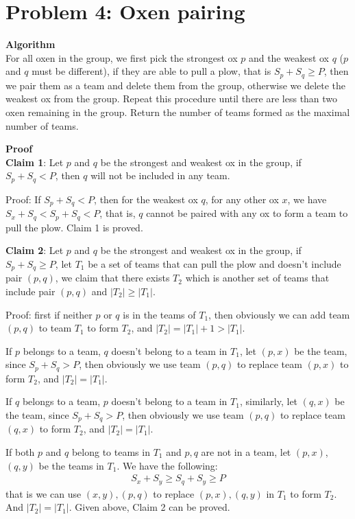 \documentclass{article}
\newcommand{\Proof}{\vspace{0.3cm} \noindent\textbf{Proof} \\}
\newcommand{\Algorithm}{\textbf{Algorithm} \\}
\begin{document}
\section*{Problem 4: Oxen pairing}
\Algorithm
For all oxen in the group, we first pick the strongest ox $p$ and the weakest ox $q$ ($p$ and $q$
must be different), if they 
are able to pull a plow, that is $S_p + S_q \geq P$, then we pair them as a team and delete them
from the group, otherwise we delete the weakest ox from the group. Repeat this procedure until there 
are less than two oxen remaining in the group. Return the number of teams formed as the maximal
number of teams.

\Proof
\textbf{Claim 1}: 
Let $p$ and $q$ be the strongest and weakest ox in the group, if $S_p + S_q < P$,
then $q$ will not be included in any team.

Proof: If $S_p + S_q < P$, then for the weakest ox $q$, for any other ox $x$, we have $S_x + S_q <
S_p + S_q < P$, that is, $q$ cannot be paired with any ox to form a team to pull the plow. Claim 1
is proved.

\vspace{0.3cm}
\textbf{Claim 2}: 
Let $p$ and $q$ be the strongest and weakest ox in the group, if $S_p + S_q \geq P$, let $T_1$ be a
set of teams that can pull the plow and doesn't include pair $(p, q)$, we claim that there exists
$T_2$ which is another set of teams that include pair $(p, q)$ and $|T_2| \geq |T_1|$.

Proof: first if neither $p$ or $q$ is in the teams of $T_1$, then obviously we can add team $(p,
q)$ to team $T_1$ to form $T_2$, and $|T_2| = |T_1| + 1 > |T_1|$.

If $p$ belongs to a team, $q$ doesn't belong to a team in $T_1$, let $(p, x)$ be the team, since 
$S_p + S_q > P$, then obviously we use team $(p, q)$ to replace team $(p, x)$ to form $T_2$, and 
$|T_2| = |T_1|$.


If $q$ belongs to a team, $p$ doesn't belong to a team in $T_1$, similarly, let $(q, x)$ be the team, since 
$S_p + S_q > P$, then obviously we use team $(p, q)$ to replace team $(q, x)$ to form $T_2$, and 
$|T_2| = |T_1|$.

If both $p$ and $q$ belong to teams in $T_1$ and $p, q$ are not in a team, let $(p, x)$, $(q, y)$ be
the teams in $T_1$. We have the following:
\begin{align}
  S_x + S_y \geq S_q + S_y \geq P 
\end{align}
that is we can use $(x, y), (p, q)$ to replace $(p, x), (q, y)$ in $T_1$ to form $T_2$. And $|T_2| =
|T_1|$.
Given above, Claim 2 can be proved.
\end{document}
